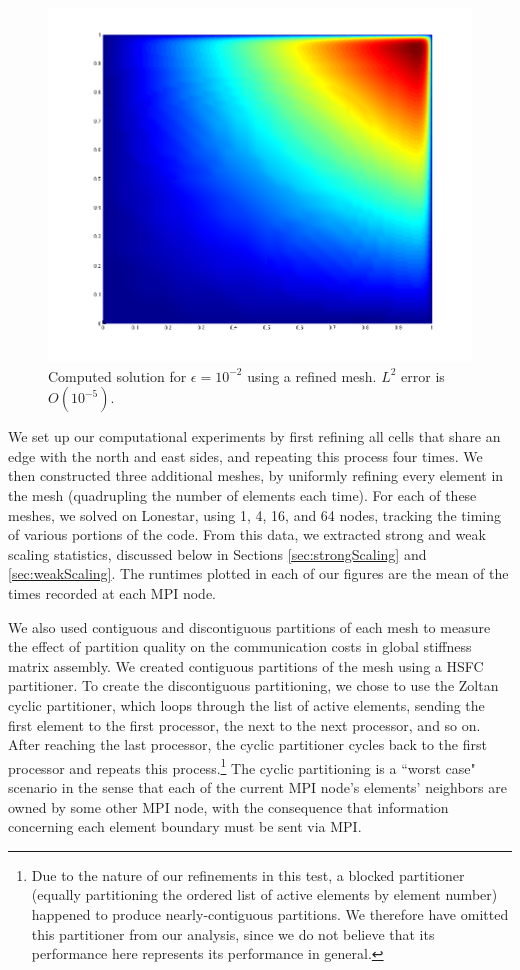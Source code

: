 \documentclass{article}
\newcommand{\oneFig}{.45}
\begin{document}
\begin{figure}[h!]
\centering
\includegraphics[scale=\oneFig]{figs/Solution12928nomesh.png}
\caption{Computed solution for $\epsilon=10^{-2}$ using a refined mesh.  $L^2$ error is $O(10^{-5})$.}
\end{figure}

We set up our computational experiments by first refining all cells that share an edge with the north and east sides, and repeating this process four times.   We then constructed three additional meshes, by uniformly refining every element in the mesh (quadrupling the number of elements each time).  For each of these meshes, we solved on Lonestar, using 1, 4, 16, and 64 nodes, tracking the timing of various portions of the code.  From this data, we extracted strong and weak scaling statistics, discussed below in Sections \ref{sec:strongScaling} and \ref{sec:weakScaling}.  The runtimes plotted in each of our figures are the mean of the times recorded at each MPI node.

We also used contiguous and discontiguous partitions of each mesh to measure the effect of partition quality on the communication costs in global stiffness matrix assembly.  We created contiguous partitions of the mesh using a HSFC partitioner.  To create the discontiguous partitioning, we chose to use the Zoltan cyclic partitioner, which loops through the list of active elements, sending the first element to the first processor, the next to the next processor, and so on.  After reaching the last processor, the cyclic partitioner cycles back to the first processor and repeats this process.\footnote{Due to the nature of our refinements in this test, a blocked partitioner (equally partitioning the ordered list of active elements by element number) happened to produce nearly-contiguous partitions.  We therefore have omitted this partitioner from our analysis, since we do not believe that its performance here represents its performance in general.}  The cyclic partitioning is a ``worst case" scenario in the sense that each of the current MPI node's elements' neighbors are owned by some other MPI node, with the consequence that information concerning each element boundary must be sent via MPI.
\end{document}
